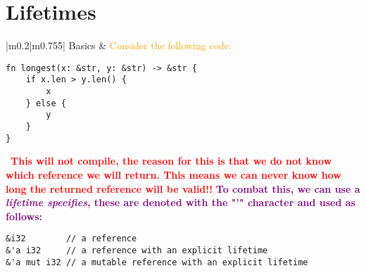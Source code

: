 \documentclass[main.tex,fontsize=8pt,paper=a4,paper=portrait,DIV=calc,]{scrartcl}
\begin{document}
\pagebreak
\begin{table}[ht!]
\section{Lifetimes}
\begin{tabular}{|m{0.2\linewidth}|m{0.755\linewidth}|}
\hline
Basics &
\textcolor{orange}{Consider the following code:}\newline
\begin{lstlisting}
fn longest(x: &str, y: &str) -> &str {
    if x.len > y.len() {
        x
    } else {
        y
    }
}
\end{lstlisting}
\, \newline
\textcolor{red}{\textbf{This will not compile, the reason for this is that we do not know which reference we will return. This means we can never know how long the returned reference will be valid!!}}\newline
\textcolor{purple}{\textbf{To combat this, we can use a \emph{lifetime specifies}, these are denoted with the "'" character and used as follows:}}\newline
\begin{lstlisting}
&i32        // a reference
&'a i32     // a reference with an explicit lifetime
&'a mut i32 // a mutable reference with an explicit lifetime


\end{lstlisting}
\end{tabular}
\end{table}
\end{document}
